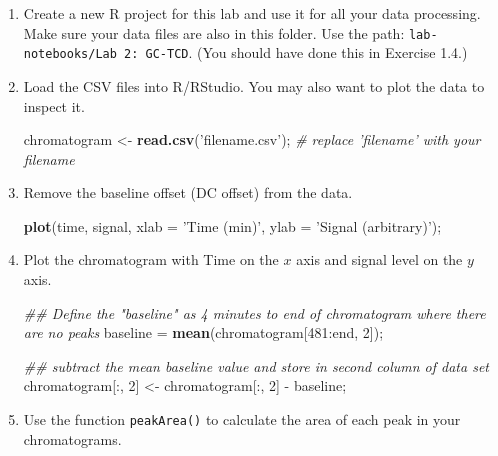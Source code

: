 \documentclass[]{tufte-book}
\newenvironment{Shaded}{}{}
\newcommand{\CommentTok}[1]{\textcolor[rgb]{0.38,0.63,0.69}{\textit{#1}}}
\newcommand{\DataTypeTok}[1]{\textcolor[rgb]{0.56,0.13,0.00}{#1}}
\newcommand{\DecValTok}[1]{\textcolor[rgb]{0.25,0.63,0.44}{#1}}
\newcommand{\KeywordTok}[1]{\textcolor[rgb]{0.00,0.44,0.13}{\textbf{#1}}}
\newcommand{\NormalTok}[1]{#1}
\newcommand{\OperatorTok}[1]{\textcolor[rgb]{0.40,0.40,0.40}{#1}}
\newcommand{\StringTok}[1]{\textcolor[rgb]{0.25,0.44,0.63}{#1}}
\begin{document}
\begin{enumerate}
\def\labelenumi{\arabic{enumi}.}
\item
  Create a new R project for this lab and use it for all your data processing. Make sure your data files are also in this folder. Use the path: \texttt{lab-notebooks/Lab\ 2:\ GC-TCD}. (You should have done this in Exercise 1.4.)
\item
  Load the CSV files into R/RStudio. You may also want to plot the data to inspect it.

\begin{Shaded}
\begin{Highlighting}[]
\NormalTok{chromatogram <-}\StringTok{ }\KeywordTok{read.csv}\NormalTok{(}\StringTok{'filename.csv'}\NormalTok{);  }\CommentTok{# replace 'filename' with your filename}
\end{Highlighting}
\end{Shaded}
\item
  Remove the baseline offset (DC offset) from the data.

\begin{Shaded}
\begin{Highlighting}[]
\KeywordTok{plot}\NormalTok{(time, signal, }\DataTypeTok{xlab =} \StringTok{'Time (min)'}\NormalTok{, }\DataTypeTok{ylab =} \StringTok{'Signal (arbitrary)'}\NormalTok{);}
\end{Highlighting}
\end{Shaded}
\item
  Plot the chromatogram with Time on the \(x\) axis and signal level on the \(y\) axis.

\begin{Shaded}
\begin{Highlighting}[]
\CommentTok{## Define the "baseline" as 4 minutes to end of chromatogram where there are no peaks}
\NormalTok{baseline =}\StringTok{ }\KeywordTok{mean}\NormalTok{(chromatogram[}\DecValTok{481}\OperatorTok{:}\NormalTok{end, }\DecValTok{2}\NormalTok{]);}

\CommentTok{## subtract the mean baseline value and store in second column of data set}
\NormalTok{chromatogram[}\OperatorTok{:}\NormalTok{, }\DecValTok{2}\NormalTok{] <-}\StringTok{ }\NormalTok{chromatogram[}\OperatorTok{:}\NormalTok{, }\DecValTok{2}\NormalTok{] }\OperatorTok{-}\StringTok{ }\NormalTok{baseline;  }
\end{Highlighting}
\end{Shaded}
\item
  Use the function \texttt{peakArea()} to calculate the area of each peak in your chromatograms.


\end{enumerate}
\end{document}
